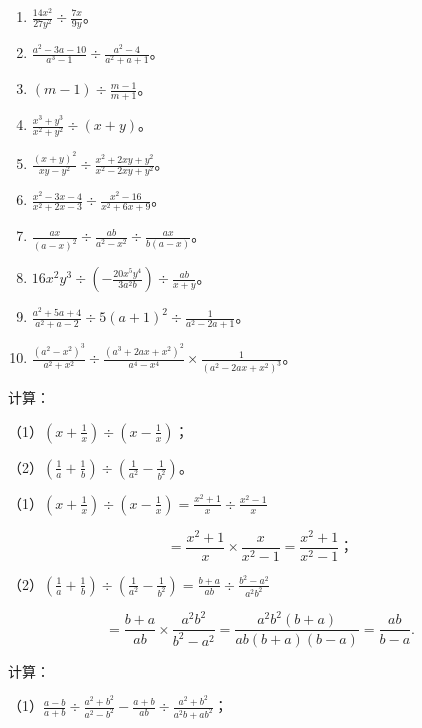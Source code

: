 \begin{enumerate}[start=1]
\item
  \(\frac{14x^2}{27y^2} \div \frac{7x}{9y}\)。
\item
  \(\frac{a^2 - 3a - 10}{a^3 - 1} \div \frac{a^2 - 4}{a^2 + a + 1}\)。
\item
  \((m - 1) \div \frac{m - 1}{m + 1}\)。
\item
  \(\frac{x^3 + y^3}{x^2 + y^2} \div (x + y)\)。
\item
  \(\frac{(x + y)^2}{xy - y^2} \div \frac{x^2 + 2xy + y^2}{x^2 - 2xy + y^2}\)。
\item
  \(\frac{x^2 - 3x - 4}{x^2 + 2x - 3} \div \frac{x^2 - 16}{x^2 + 6x + 9}\)。
\item
  \(\frac{ax}{(a - x)^2} \div \frac{ab}{a^2 - x^2} \div \frac{ax}{b(a - x)}\)。
\item
  \(16x^{2}y^{3} \div \left(-\frac{20x^{5}y^{4}}{3a^{2}b}\right) \div \frac{ab}{x + y}\)。
\item
  \(\frac{a^2 + 5a + 4}{a^2 + a - 2} \div 5(a + 1)^2 \div \frac{1}{a^2 - 2a + 1}\)。
\item
  \(\frac{(a^2 - x^2)^3}{a^2 + x^2} \div \frac{(a^3 + 2ax + x^2)^2}{a^4 - x^4} \times \frac{1}{(a^2 - 2ax + x^2)^3}\)。
\end{enumerate}

 计算：

（1）\(\left(x + \frac{1}{x}\right) \div \left(x - \frac{1}{x}\right)\)；

（2）\(\left(\frac{1}{a} + \frac{1}{b}\right) \div \left(\frac{1}{a^2} - \frac{1}{b^2}\right)\)。

（1）\(\left(x + \frac{1}{x}\right) \div \left(x - \frac{1}{x}\right) = \frac{x^2 + 1}{x} \div \frac{x^2 - 1}{x}\)

\[
= \frac{x ^{2} + 1}{x} \times \frac{x}{x ^{2} - 1} = \frac{x ^{2} + 1}{x ^{2} - 1}\text{；}
\]

（2）\(\left(\frac{1}{a} + \frac{1}{b}\right) \div \left(\frac{1}{a^2} - \frac{1}{b^2}\right) = \frac{b + a}{ab} \div \frac{b^2 - a^2}{a^2b^2}\)

\[
= \frac{b + a}{a b} \times \frac{a ^{2} b ^{2}}{b ^{2} - a ^{2}} = \frac{a ^{2} b ^{2} (b + a)}{a b (b + a) (b - a)} = \frac{a b}{b - a}.
\]

 计算：

（1）\(\frac{a - b}{a + b} \div \frac{a^2 + b^2}{a^2 - b^2} - \frac{a + b}{ab} \div \frac{a^2 + b^2}{a^2b + ab^2}\)；

